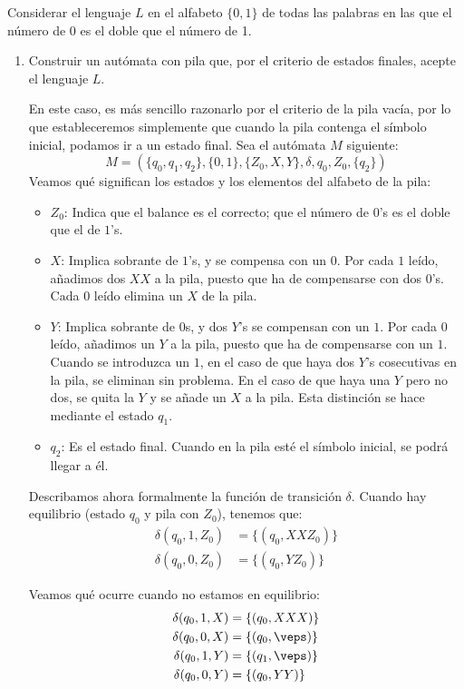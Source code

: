\begin{ejercicio}\label{ej:1.5.6}
    Considerar el lenguaje $L$ en el alfabeto $\{0,1\}$ de todas las palabras en las que el número de 0 es el doble que el número de 1.
    \begin{enumerate}
        \item Construir un autómata con pila que, por el criterio de estados finales, acepte el lenguaje $L$.
        
        En este caso, es más sencillo razonarlo por el criterio de la pila vacía, por lo que estableceremos simplemente que cuando la pila contenga el símbolo inicial, podamos ir a un estado final. Sea el autómata $M$ siguiente:
        $$M = (\{q_0,q_1, q_2\},\{0,1\},\{Z_0,X, Y\},\delta,q_0,Z_0,\{q_2\})$$
        Veamos qué significan los estados y los elementos del alfabeto de la pila:
        \begin{itemize}
            \item $Z_0$: Indica que el balance es el correcto; que el número de $0$'s es el doble que el de $1$'s.
            \item $X$: Implica sobrante de $1$'s, y se compensa con un $0$. Por cada $1$ leído, añadimos dos $XX$ a la pila, puesto que ha de compensarse con dos $0$'s. Cada $0$ leído elimina un $X$ de la pila.
            \item $Y$: Implica sobrante de $0$s, y dos $Y$'s se compensan con un $1$. Por cada $0$ leído, añadimos un $Y$ a la pila, puesto que ha de compensarse con un $1$. Cuando se introduzca un $1$, en el caso de que haya dos $Y$'s cosecutivas en la pila, se eliminan sin problema. En el caso de que haya una $Y$ pero no dos, se quita la $Y$ y se añade un $X$ a la pila. Esta distinción se hace mediante el estado $q_1$.
            \item $q_2$: Es el estado final. Cuando en la pila esté el símbolo inicial, se podrá llegar a él.
        \end{itemize}

        Describamos ahora formalmente la función de transición $\delta$. Cuando hay equilibrio (estado $q_0$ y pila con $Z_0$), tenemos que:
        \begin{align*}
            \delta(q_0,1,Z_0) &= \{(q_0,XXZ_0)\} \\
            \delta(q_0,0,Z_0) &= \{(q_0,YZ_0)\}
        \end{align*}

        Veamos qué ocurre cuando no estamos en equilibrio:
        \begin{align*}
            \delta(q_0,1,X) &= \{(q_0,XXX)\} \\
            \delta(q_0,0,X) &= \{(q_0,\veps)\}\\
            \delta(q_0,1,Y) &= \{(q_1,\veps)\} \\
            \delta(q_0,0,Y) &= \{(q_0,YY)\}
        \end{align*}


\end{enumerate}
\end{ejercicio}
